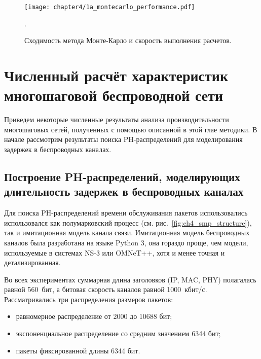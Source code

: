\begin{figure}[h]
    \texttt{[image: chapter4/1a\_montecarlo\_performance.pdf]}
    \caption{Сходимость метода Монте-Карло и скорость выполнения расчетов.}.\label{fig:results-approx-mc-precision}
\end{figure}
























\section{Численный расчёт характеристик многошаговой беспроводной сети}\label{sec:ch4_numeric_results}
Приведем некоторые численные результаты анализа производительности многошаговых сетей, полученных с помощью описанной в этой глае методики. В начале рассмотрим результаты поиска PH-распределений для моделирования задержек в беспроводных каналах.

\subsection{Построение PH-распределений, моделирующих длительность задержек в беспроводных каналах}
Для поиска PH-распределений времени обслуживания пакетов использовались использовался как полумарковский процесс (см. рис.~\ref{fig:ch4_smp_structure}), так и имитационная модель канала связи. Имитационная модель беспроводных каналов была разработана на языке Python 3, она гораздо проще, чем модели, используемые в системах NS-3 или OMNeT++, хотя и менее точная и детализированная.

Во всех экспериментах суммарная длина заголовков (IP, MAC, PHY) полагалась равной 560~бит, а битовая скорость каналов равной 1000~кбит/с. Рассматривались три распределения размеров пакетов:

\begin{itemize}
	\item равномерное распределение от 2000 до 10688 бит;
	\item экспоненциальное распределение со средним значением 6344 бит;
	\item пакеты фиксированной длины 6344 бит.
\end{itemize}

